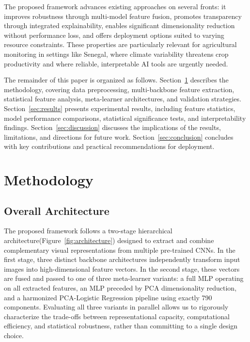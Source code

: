 \documentclass[pdflatex,sn-basic]{sn-jnl}
\begin{document}
The proposed framework advances existing approaches on several fronts: it improves robustness through multi-model feature fusion, promotes transparency through integrated explainability, enables significant dimensionality reduction without performance loss, and offers deployment options suited to varying resource constraints. These properties are particularly relevant for agricultural monitoring in settings like Senegal, where climate variability threatens crop productivity and where reliable, interpretable AI tools are urgently needed.

The remainder of this paper is organized as follows. Section~\ref{sec:methodology} describes the methodology, covering data preprocessing, multi-backbone feature extraction, statistical feature analysis, meta-learner architectures, and validation strategies. Section~\ref{sec:results} presents experimental results, including feature statistics, model performance comparisons, statistical significance tests, and interpretability findings. Section~\ref{sec:discussion} discusses the implications of the results, limitations, and directions for future work. Section~\ref{sec:conclusion} concludes with key contributions and practical recommendations for deployment.

\section{Methodology}
\label{sec:methodology}

\subsection{Overall Architecture}
\label{subsec:architecture}

The proposed framework follows a two-stage hierarchical architecture(Figure~\ref{fig:architecture}) designed to extract and combine complementary visual representations from multiple pre-trained CNNs. In the first stage, three distinct backbone architectures independently transform input images into high-dimensional feature vectors. In the second stage, these vectors are fused and passed to one of three meta-learner variants: a full MLP operating on all extracted features, an MLP preceded by PCA dimensionality reduction, and a harmonized PCA-Logistic Regression pipeline using exactly 790 components. Evaluating all three variants in parallel allows us to rigorously characterize the trade-offs between representational capacity, computational efficiency, and statistical robustness, rather than committing to a single design choice.
\end{document}
